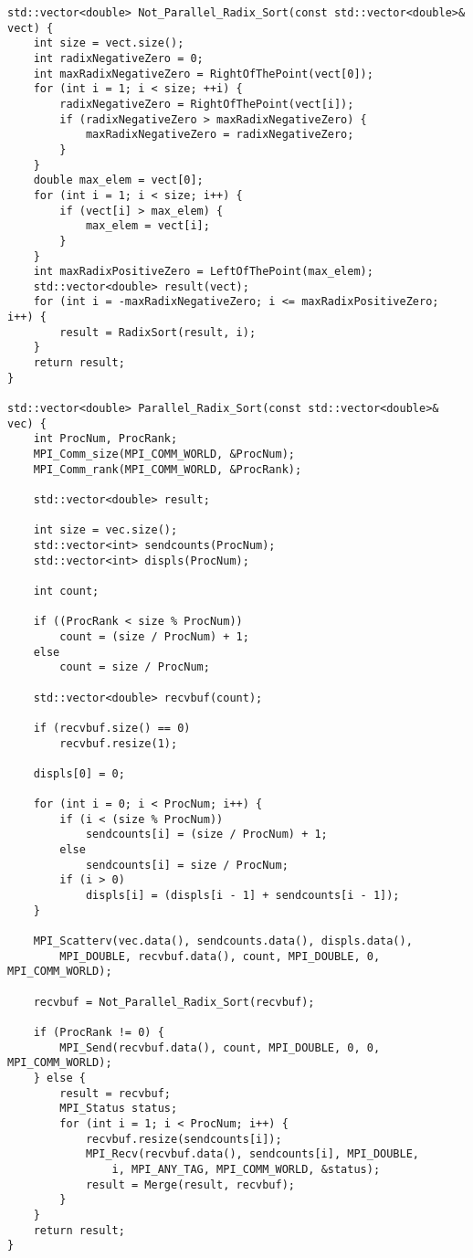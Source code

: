 \documentclass[12pt]{report}
\begin{document}
\begin{lstlisting}
std::vector<double> Not_Parallel_Radix_Sort(const std::vector<double>& vect) {
    int size = vect.size();
    int radixNegativeZero = 0;
    int maxRadixNegativeZero = RightOfThePoint(vect[0]);
    for (int i = 1; i < size; ++i) {
        radixNegativeZero = RightOfThePoint(vect[i]);
        if (radixNegativeZero > maxRadixNegativeZero) {
            maxRadixNegativeZero = radixNegativeZero;
        }
    }
    double max_elem = vect[0];
    for (int i = 1; i < size; i++) {
        if (vect[i] > max_elem) {
            max_elem = vect[i];
        }
    }
    int maxRadixPositiveZero = LeftOfThePoint(max_elem);
    std::vector<double> result(vect);
    for (int i = -maxRadixNegativeZero; i <= maxRadixPositiveZero; i++) {
        result = RadixSort(result, i);
    }
    return result;
}

std::vector<double> Parallel_Radix_Sort(const std::vector<double>& vec) {
    int ProcNum, ProcRank;
    MPI_Comm_size(MPI_COMM_WORLD, &ProcNum);
    MPI_Comm_rank(MPI_COMM_WORLD, &ProcRank);

    std::vector<double> result;

    int size = vec.size();
    std::vector<int> sendcounts(ProcNum);
    std::vector<int> displs(ProcNum);

    int count;

    if ((ProcRank < size % ProcNum))
        count = (size / ProcNum) + 1;
    else
        count = size / ProcNum;

    std::vector<double> recvbuf(count);

    if (recvbuf.size() == 0)
        recvbuf.resize(1);

    displs[0] = 0;

    for (int i = 0; i < ProcNum; i++) {
        if (i < (size % ProcNum))
            sendcounts[i] = (size / ProcNum) + 1;
        else
            sendcounts[i] = size / ProcNum;
        if (i > 0)
            displs[i] = (displs[i - 1] + sendcounts[i - 1]);
    }

    MPI_Scatterv(vec.data(), sendcounts.data(), displs.data(),
        MPI_DOUBLE, recvbuf.data(), count, MPI_DOUBLE, 0, MPI_COMM_WORLD);

    recvbuf = Not_Parallel_Radix_Sort(recvbuf);

    if (ProcRank != 0) {
        MPI_Send(recvbuf.data(), count, MPI_DOUBLE, 0, 0, MPI_COMM_WORLD);
    } else {
        result = recvbuf;
        MPI_Status status;
        for (int i = 1; i < ProcNum; i++) {
            recvbuf.resize(sendcounts[i]);
            MPI_Recv(recvbuf.data(), sendcounts[i], MPI_DOUBLE,
                i, MPI_ANY_TAG, MPI_COMM_WORLD, &status);
            result = Merge(result, recvbuf);
        }
    }
    return result;
}

\end{lstlisting}
\end{document}

